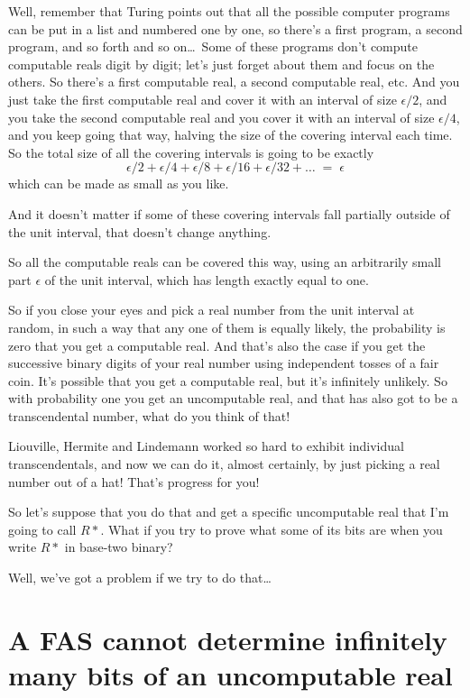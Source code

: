 \documentclass[12pt]{book}
\begin{document}
Well, remember that Turing points out that all the possible computer programs can be
put in a list and numbered one by one, so there's a first program, a second program,
and so forth and so on\ldots\
Some of these programs don't compute computable reals digit by digit; let's just forget
about them and focus on the others.
So there's a first computable real, a second computable real, etc.
And you just take the first computable real and cover it with an interval of size $\epsilon/2$,
and you take  the second computable real and you 
cover it with an interval of size $\epsilon/4$, and you keep going that way, halving the
size of the covering interval each time.
So the total size of all the covering intervals is going to be exactly
\[
   \epsilon/2 + \epsilon/4 + \epsilon/8 + \epsilon/16 + \epsilon/32 + \ldots \; = \; \epsilon
\] 
which can be made as small as you like.
 
And it doesn't matter if some of these covering intervals fall partially outside of the
unit interval, that doesn't change anything.
 
So all the computable reals can be covered this way, using an arbitrarily small part 
$\epsilon$
of
the unit interval, which has length exactly equal to one.
 
So if you close your eyes and pick a real number from the unit interval at random,
in such a way that any one of them is equally likely, the probability is zero that
you get a computable real.  And that's also the case if you get the successive binary
digits of your real number using independent tosses of a fair coin.  It's possible
that you get a computable real, but it's infinitely unlikely.  So with probability one
you get an uncomputable real, and that has also got to be a transcendental number, what
do you think of that!
 
Liouville, Hermite and Lindemann worked so hard to exhibit individual transcendentals,
and now we can do it, almost certainly, by just picking a real number out of a hat!
That's progress for you!
 
So let's suppose that you do that and get a specific uncomputable real that I'm
going to call $R*$.  What if you try to prove what some of its bits are when you
write $R*$ in base-two binary?
 
Well, we've got a problem if we try to do that\ldots

\section*{A FAS cannot determine infinitely many bits of an uncomputable real}
\end{document}
